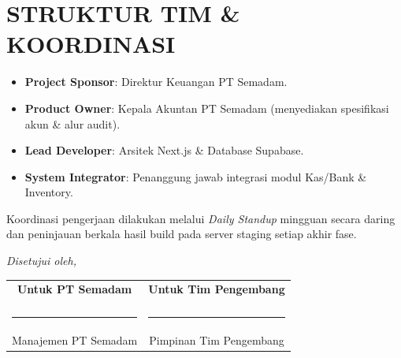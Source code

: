 \documentclass[11pt,a4paper]{article}
\begin{document}
\section{STRUKTUR TIM \& KOORDINASI}
\begin{itemize}
    \item \textbf{Project Sponsor}: Direktur Keuangan PT Semadam.
    \item \textbf{Product Owner}: Kepala Akuntan PT Semadam (menyediakan spesifikasi akun \& alur audit).
    \item \textbf{Lead Developer}: Arsitek Next.js \& Database Supabase.
    \item \textbf{System Integrator}: Penanggung jawab integrasi modul Kas/Bank \& Inventory.
\end{itemize}

\begin{notealert}
Koordinasi pengerjaan dilakukan melalui \textit{Daily Standup} mingguan secara daring dan peninjauan berkala hasil build pada server staging setiap akhir fase.
\end{notealert}

\vspace{2cm}

\begin{center}
\textit{Disetujui oleh,}
\end{center}

\vspace{1cm}

\begin{table}[h!]
\centering
\begin{tabular}{cc}
    \textbf{Untuk PT Semadam} & \textbf{Untuk Tim Pengembang} \\
    \vspace{2cm} & \vspace{2cm} \\
    \rule{5cm}{0.5pt} & \rule{5cm}{0.5pt} \\
    Manajemen PT Semadam & Pimpinan Tim Pengembang \\
\end{tabular}
\end{table}
\end{document}
